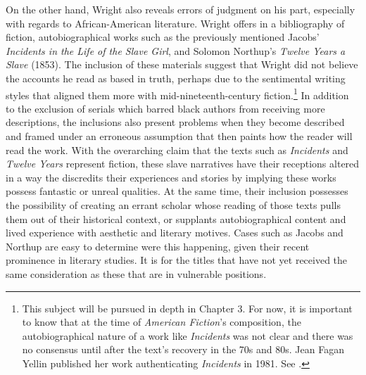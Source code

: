 On the other hand, Wright also reveals errors of judgment on his part, especially with regards to African-American literature. Wright offers in a bibliography of fiction, autobiographical works such as the previously mentioned Jacobs' \textit{Incidents in the Life of the Slave Girl}, and Solomon Northup's \textit{Twelve Years a Slave} (1853). The inclusion of these materials suggest that Wright did not believe the accounts he read as based in truth, perhaps due to the sentimental writing styles that aligned them more with mid-nineteenth-century fiction.\footnote{This subject will be pursued in depth in Chapter 3. For now, it is important to know that at the time of \textit{American Fiction}'s composition, the autobiographical nature of a work like \textit{Incidents} was not clear and there was no consensus until after the text's recovery in the 70s and 80s. Jean Fagan Yellin published her work authenticating \textit{Incidents} in 1981. See \autocite{yellin_written_1981}.} In addition to the exclusion of serials which barred black authors from receiving more descriptions, the inclusions also present problems when they become described and framed under an erroneous assumption that then paints how the reader will read the work. With the overarching claim that the texts such as \textit{Incidents} and \textit{Twelve Years} represent fiction, these slave narratives have their receptions altered in a way the discredits their experiences and stories by implying these works possess fantastic or unreal qualities. At the same time, their inclusion possesses the possibility of creating an errant scholar whose reading of those texts pulls them out of their historical context, or supplants autobiographical content and lived experience with aesthetic and literary motives. Cases such as Jacobs and Northup are easy to determine were this happening, given their recent prominence in literary studies. It is for the titles that have not yet received the same consideration as these that are in vulnerable positions. 

